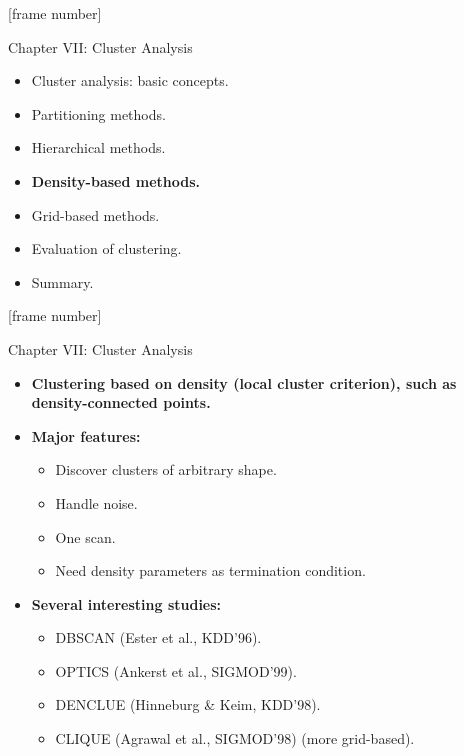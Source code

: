 \documentclass[aspectratio=169,t,xcolor=dvipsnames]{beamer}
\begin{document}
  {
    [frame number]
    \begin{frame}{Chapter VII: Cluster Analysis}
        \begin{itemize}
            \item Cluster analysis: basic concepts.
            \item Partitioning methods.
            \item Hierarchical methods.
            \item \textbf{Density-based methods.}
            \item Grid-based methods.
            \item Evaluation of clustering.
            \item Summary.
        \end{itemize}
    \end{frame}
  }

  {
    [frame number]
    \begin{frame}{Chapter VII: Cluster Analysis}
        \begin{itemize}
          \item \textbf{Clustering based on density (local cluster criterion), such as density-connected points.}
          \item \textbf{Major features:}
          \begin{itemize}
            \item Discover clusters of arbitrary shape.
            \item Handle noise.
            \item One scan.
            \item Need density parameters as termination condition.
          \end{itemize}
          \item \textbf{Several interesting studies:}
          \begin{itemize}
            \item DBSCAN (Ester et al., KDD'96).
            \item OPTICS (Ankerst et al., SIGMOD'99).
            \item DENCLUE (Hinneburg \& Keim, KDD'98).
            \item CLIQUE (Agrawal et al., SIGMOD'98) (more grid-based).
          \end{itemize}
        \end{itemize}
    \end{frame}
  }
\end{document}

